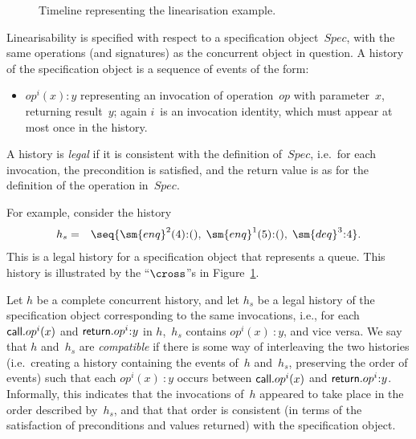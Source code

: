 
\begin{figure}
\unScalaMid
\def\X{node{$\cross$}}
\begin{center}
\end{center}
\caption{Timeline representing the linearisation example.}
\label{fig:lin-timeline}
\scalaMid
\end{figure}


Linearisability is specified with respect to a specification object~$Spec$,
with the same operations (and signatures) as the concurrent object in
question.  A history of the specification object is a sequence of events of
the form:
%
\begin{itemize}
\item $op^i(x):y$ representing an invocation of operation~$op$ with
  parameter~$x$, returning result~$y$; again $i$~is an invocation identity,
  which must appear at most once in the history.
\end{itemize}
%
A history is \emph{legal} if it is consistent with the definition of~$Spec$,
i.e.~for each invocation, the precondition is satisfied, and the return value
is as for the definition of the operation in~$Spec$.

For example, consider the history
\begin{eqnarray*}
h_s & = & \seq{\sm{enq}^2(4)\::(),\; \sm{enq}^1(5)\::(),\; \sm{deq}^3\::4}.
\end{eqnarray*}
%
This is a legal history for a specification object that represents a queue.
This history is illustrated by the ``$\cross$''s in
Figure~\ref{fig:lin-timeline}.

Let $h$ be a complete concurrent history, and let $h_s$ be a legal history of
the specification object corresponding to the same invocations, i.e., for each
$\mathsf{call}.op^i(x)$ and $\return.op^i\::y$ in $h$,\, $h_s$ contains $op^i(x)\::y$,
and vice versa.  We say that $h$ and~$h_s$ are \emph{compatible} if there is
some way of interleaving the two histories (i.e.~creating a history containing
the events of~$h$ and~$h_s$, preserving the order of events) such that each
$op^i(x)\::y$ occurs between $\mathsf{call}.op^i(x)$ and $\return.op^i\::y$.
Informally, this indicates that the invocations of~$h$ appeared to take place
in the order described by~$h_s$, and that that order is consistent (in terms
of the satisfaction of preconditions and values returned) with the
specification object.

